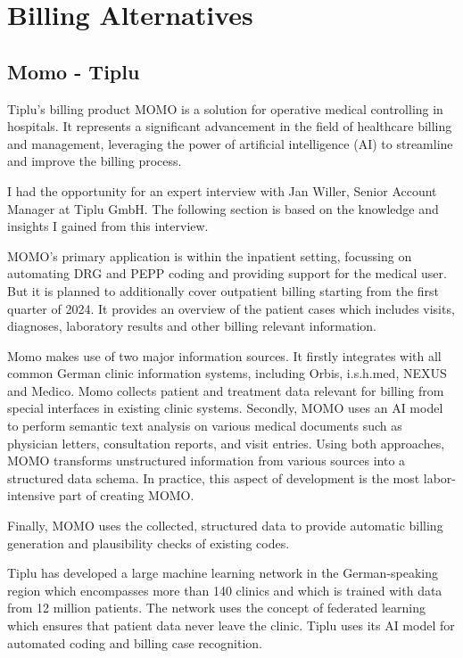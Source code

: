 \section{Billing Alternatives}\label{sec:billing-alternatives}

\subsection{Momo - Tiplu}


Tiplu's billing product MOMO is a solution for operative medical controlling in hospitals.
It represents a significant advancement in the field of healthcare billing and management,
leveraging the power of artificial intelligence (AI) to streamline and improve the billing process.

I had the opportunity for an expert interview with Jan Willer, Senior Account Manager at Tiplu GmbH.
The following section is based on the knowledge and insights I gained from this interview.

MOMO's primary application is within the inpatient setting, focussing on automating DRG and PEPP coding and providing support for the medical user.
But it is planned to additionally cover outpatient billing starting from the first quarter of 2024.
It provides an overview of the patient cases which includes visits, diagnoses, laboratory results and other billing relevant information.

Momo makes use of two major information sources.
It firstly integrates with all common German clinic information systems, including Orbis, i.s.h.med, NEXUS and Medico.
Momo collects patient and treatment data relevant for billing from special interfaces in existing clinic systems.
Secondly, MOMO uses an AI model to perform semantic text analysis on various medical documents such as physician letters, consultation reports, and visit entries.
Using both approaches, MOMO transforms unstructured information from various sources into a structured data schema.
In practice, this aspect of development is the most labor-intensive part of creating MOMO.

Finally, MOMO uses the collected, structured data to provide automatic billing generation and plausibility checks of existing codes.

Tiplu has developed a large machine learning network in the German-speaking region which encompasses more than 140 clinics and which is trained with data from 12 million patients.
The network uses the concept of federated learning which ensures that patient data never leave the clinic.
Tiplu uses its AI model for automated coding and billing case recognition.

